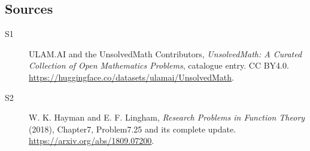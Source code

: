\documentclass[11pt]{article}
\begin{document}
\subsection{Sources}
\begin{description}
\item[\hypertarget{source:statement:1}{S1}] ULAM.AI and the UnsolvedMath Contributors, \emph{UnsolvedMath: A Curated Collection of Open Mathematics Problems}, catalogue entry. CC BY4.0. \url{https://huggingface.co/datasets/ulamai/UnsolvedMath}.
\item[\hypertarget{source:statement:2}{S2}] W. K. Hayman and E. F. Lingham, \emph{Research Problems in Function Theory} (2018), Chapter7, Problem7.25 and its complete update. \url{https://arxiv.org/abs/1809.07200}.
\end{description}
\label{end:statement}
\end{document}
